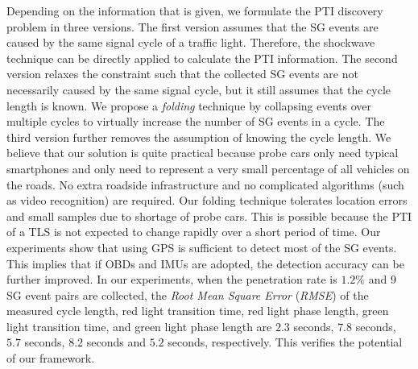 \documentclass[final,oneside,onecolumn,12pt,a4paper]{book}%
\begin{document}
Depending on the information that is given, we formulate the PTI discovery
problem in three versions. The first version assumes that the SG events are
caused by the same signal cycle of a traffic light. Therefore, the shockwave
technique can be directly applied to calculate the PTI information. The second
version relaxes the constraint such that the collected SG events are not
necessarily caused by the same signal cycle, but it still assumes that the
cycle length is known. We propose a \emph{folding} technique by collapsing
events over multiple cycles to virtually increase the number of SG events in a
cycle. The third version further removes the assumption of knowing the cycle
length. We believe that our solution is quite practical because probe cars
only need typical smartphones and only need to represent a very small
percentage of all vehicles on the roads. No extra roadside infrastructure and
no
complicated algorithms (such as video recognition) are required. Our folding
technique tolerates location errors and small samples due to shortage of probe
cars. This is possible because the PTI of a TLS is not expected to change
rapidly over a short period of time. Our experiments show that using GPS is
sufficient to detect most of the SG events. This implies that if OBDs and IMUs
are adopted, the detection accuracy can be further improved.
In our experiments, when the penetration rate is $1.2\%$ and 9 SG event pairs
are collected, the \emph{Root Mean Square Error} (\emph{RMSE}) of the measured
cycle length, red light transition time, red light phase length, green light
transition time, and green light phase length are $2.3$ seconds, $7.8$
seconds, $5.7$ seconds, $8.2$ seconds and $5.2$ seconds, respectively. This
verifies the potential of our framework.
\end{document}

